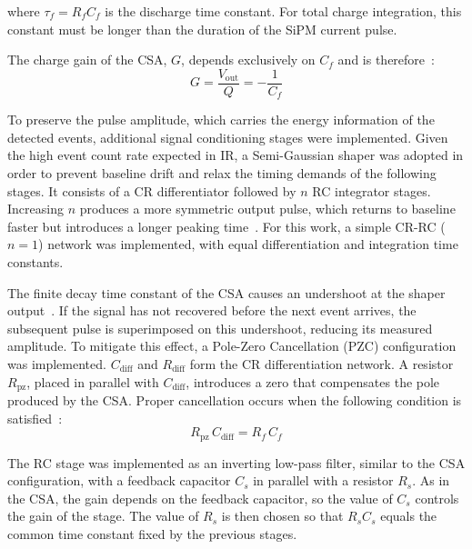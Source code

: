 \noindent where $\tau_f = R_f C_f$ is the discharge time constant. For total
charge integration, this constant must be longer than the duration of the SiPM current pulse.

The charge gain of the CSA, $G$,  depends exclusively on $C_f$ and is therefore~\cite{106}:
\begin{equation}
    G = \frac{V_{\text{out}}}{Q} = -\frac{1}{C_f}
    \label{eq:gain}
\end{equation}

To preserve the pulse amplitude, which carries the energy information of the detected events, additional signal conditioning stages were implemented. Given the high event count rate expected in IR, a Semi-Gaussian shaper was adopted in order to prevent baseline drift and relax the timing demands of the following stages. It consists of a CR differentiator followed by $n$ RC integrator stages. Increasing $n$ produces a more symmetric output pulse, which returns to baseline faster but introduces a longer peaking time~\cite{14}. For this work, a simple CR-RC ($n=1$) network was implemented, with equal differentiation and integration time constants.

The finite decay time constant of the CSA causes an undershoot at the shaper output~\cite{107}. If the signal has not recovered before the next event arrives, the subsequent pulse is superimposed on this undershoot, reducing its measured amplitude. To mitigate this effect, a Pole-Zero Cancellation (PZC) configuration was implemented. $C_{\text{diff}}$ and $R_{\text{diff}}$ form the CR differentiation network. A resistor $R_{\text{pz}}$, placed in parallel with $C_{\text{diff}}$, introduces a zero that compensates the pole produced by the CSA. Proper cancellation occurs when the following condition is satisfied~\cite{108,14,110}:
\begin{equation}
    R_{\text{pz}}\, C_{\text{diff}} = R_f\, C_f
    \label{eq:pzc}
\end{equation}

 The RC stage was implemented as an inverting low-pass filter, similar to the CSA configuration, with a feedback capacitor $C_s$ in parallel with a resistor $R_s$. As in the CSA, the gain depends on the feedback capacitor, so the value of $C_s$ controls the gain of the stage. The value of $R_s$ is then chosen so that $R_s C_s$ equals the common time constant fixed by the previous stages.

